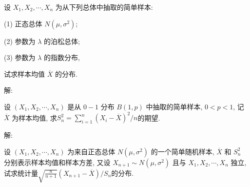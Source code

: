 \documentclass[standard]{ExBook}
\begin{document}
\begin{qitems}
\vspace{-5em}

    \begin{bbox}
    \begin{shaded}
        \qitem
设 \( X_1, X_2, \cdots, X_n \) 为从下列总体中抽取的简单样本:

(1) 正态总体 \( N(\mu, \sigma^2) \);

(2) 参数为 \(\lambda\) 的泊松总体;

(3) 参数为 \(\lambda\) 的指数分布,

试求样本均值 \(\overline{X}\) 的分布.
    \end{shaded}
    \end{bbox}

\vspace{-5em}

    \begin{bbox}
解: 
    \end{bbox}

\vspace{-5em}

    \begin{bbox}
    \begin{shaded}
        \qitem
设 \((X_1, X_2, \cdots, X_n)\) 是从 \(0-1\) 分布 \(B(1, p)\) 中抽取的简单样本, \(0 < p < 1\), 记 \(\overline{X}\) 为样本均值, 求\(\displaystyle S_n^2 = \sum\limits_{i=1}^n (X_i - \overline{X})^2 \big/ n\)的期望.
    \end{shaded}
    \end{bbox}

\vspace{-5em}

    \begin{bbox}
解: 
    \end{bbox}

\vspace{-5em}

    \begin{bbox}
    \begin{shaded}
        \qitem
设 \( (X_1, X_2, \cdots, X_n) \) 为来自正态总体 \( N(\mu, \sigma^2) \) 的一个简单随机样本, \( \overline{X} \) 和 \( S_n^2 \) 分别表示样本均值和样本方差, 又设 \( X_{n+1} \sim N(\mu, \sigma^2) \) 且与 \( X_1, X_2, \cdots, X_n \) 独立, 试求统计量\(\displaystyle \sqrt{\frac{n}{n+1}} (X_{n+1} - \overline{X}) \big/ S_n\)的分布.
    \end{shaded}
    \end{bbox}

\vspace{-5em}


\end{qitems}
\end{document}
